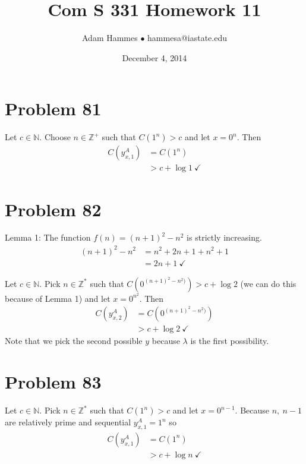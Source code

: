 \documentclass[11pt]{article}
\begin{document}
\title{Com S 331 Homework 11}
\author{Adam Hammes $\bullet$ hammesa@iastate.edu}
\date{December 4, 2014}
\maketitle


\section*{Problem 81}

Let $c \in \mathbb{N}$. Choose $n \in \mathbb{Z}^+$ such that $C(1^n) > c$ and let $x = 0^n$.
Then
	\begin{align*}
		C(y_{x,1} ^A) &= C(1^n) \\
		&> c + \log 1 \ \checkmark
	\end{align*}


\section*{Problem 82}

Lemma 1: The function $f(n) = (n+1)^2 - n^2$ is strictly increasing.
	\begin{align*}
		(n+1)^2 - n^2 &= n^2 + 2n + 1 + n^2 + 1 \\
		&= 2n +1 \ \checkmark
	\end{align*}

Let $c \in \mathbb{N}$.
Pick $n \in \mathbb{Z^*}$ such that $C( 0^{(n+1)^2 - n^2)}) > c + \log 2$ (we can do this because of Lemma 1) and let $x= 0^{n^2}$.
Then
	\begin{align*}
		C(y _{x, 2} ^A) &= C( 0^{(n+1)^2 - n^2)}) \\
		&> c + \log 2 \ \checkmark
	\end{align*}
Note that we pick the second possible $y$ because $\lambda$ is the first possibility.


\section*{Problem 83}

Let $c \in \mathbb{N}$.
Pick $n \in \mathbb{Z^*}$ such that $C(1^n) > c$ and let $x = 0 ^{n-1}$.
Because $n,\ n-1$ are relatively prime and sequential $y _{x,1} ^{A} = 1^n$ so
	\begin{align*}
		C( y _{x,1} ^{A} ) &= C(1^n) \\
		&> c + \log n \ \checkmark
	\end{align*}
\end{document}
